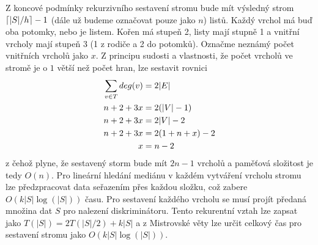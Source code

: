 Z koncové podmínky rekurzivního sestavení stromu bude mít výsledný strom $\lceil|S|/h\rceil- 1$ (dále už budeme označovat pouze jako $n$) listů. Každý vrchol má buď oba potomky, nebo je listem. Kořen má stupeň 2, listy mají stupně 1 a vnitřní vrcholy mají stupeň 3 (1 z rodiče a 2 do potomků). Označme neznámý počet vnitřních vrcholů jako $x$. Z principu sudosti a vlastnosti, že počet vrcholů ve stromě je o $1$ větší než počet hran, lze sestavit rovnici
\begin{align}
  \label{eq:kd-tree-vertex-count}
  \sum_{v \in T}deg(v) &= 2|E|\notag\\
            n + 2 + 3x &= 2(|V|-1)\notag\\
            n + 2 + 3x &= 2|V|-2\notag\\
            n + 2 + 3x &= 2(1+n+x)-2\notag\\
                     x &= n-2\notag 
\end{align}
z čehož plyne, že sestavený storm bude mít $2n - 1$ vrcholů a paměťová složitost je tedy $O(n)$. Pro lineární hledání mediánu v každém vytváření vrcholu stromu lze předzpracovat data seřazením přes každou složku, což zabere $O(k|S|\log(|S|))$ času. Pro sestavení každého vrcholu se musí projít předaná množina dat $S$ pro nalezení diskriminátoru. Tento rekurentní vztah lze zapsat jako $T(|S|) = 2T(|S|/2) + k|S|$ a z Mistrovské věty lze určit celkový čas pro sestavení stromu jako $O(k|S|\log(|S|))$.

